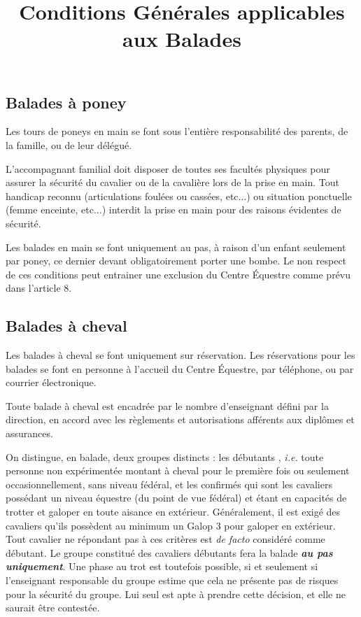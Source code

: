 \documentclass[11pt,a4paper]{article}
\title{Conditions Générales applicables aux Balades}
\author{}
\date{}
\renewcommand{\emph}[1]{\textit{\textbf{#1}}}
\begin{document}
\maketitle


\subsection*{Balades à poney}
Les tours de poneys en main se font sous l'entière responsabilité des parents, de la famille, ou de leur délégué. \par
L'accompagnant familial doit disposer de toutes ses facultés physiques pour assurer la sécurité du cavalier ou de la cavalière lors de la prise en main. Tout handicap reconnu (articulations foulées ou cassées, etc...) ou situation ponctuelle (femme enceinte, etc...) interdit la prise en main pour des raisons évidentes de sécurité.

Les balades en main se font uniquement au pas, à raison d'un enfant seulement par poney, ce dernier devant obligatoirement porter une bombe. Le non respect de ces conditions peut entrainer une exclusion du Centre Équestre comme prévu dans l'article 8.

\subsection*{Balades à cheval}
Les balades à cheval se font uniquement sur réservation. Les réservations pour les balades se font en personne à l'accueil du Centre Équestre, par téléphone, ou par courrier électronique.

Toute balade à cheval est encadrée par le nombre d'enseignant défini par la direction, en accord avec les règlements et autorisations afférents aux diplômes et assurances.

On distingue, en balade, deux groupes distincts : les \og débutants \fg{}, \textit{i.e.} toute personne non expérimentée montant à cheval pour le première fois ou seulement occasionnellement, sans niveau fédéral, et les \og confirmés \fg{} qui sont les cavaliers possédant un niveau équestre (du point de vue fédéral) et étant en capacités de trotter et galoper en toute aisance en extérieur. Généralement, il est exigé des cavaliers qu'ils possèdent au minimum un Galop 3 pour galoper en extérieur. Tout cavalier ne répondant pas à ces critères est \textit{de facto} considéré comme débutant. Le groupe constitué des cavaliers débutants fera la balade \emph{au pas uniquement}. Une phase au trot est toutefois possible, si et seulement si l'enseignant responsable du groupe estime que cela ne présente pas de risques pour la sécurité du groupe. Lui seul est apte à prendre cette décision, et elle ne saurait être contestée.
\end{document}
